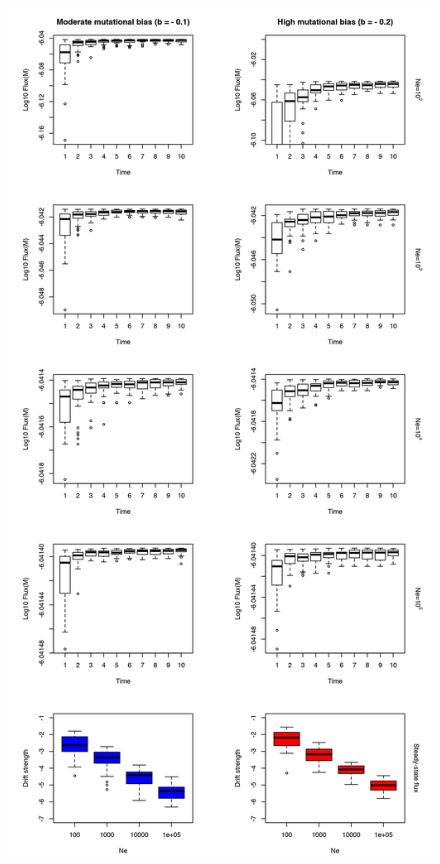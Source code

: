 \begin{figure}[H]
\vspace{-0.5cm}
\begin{center}
\includegraphics[scale=0.5,trim=0cm 0cm 0cm 0cm,clip]{pics/SM-Enzymes/Evo_SteadyState_PosMutCorr_LowF.jpeg} 

\end{center}
\end{figure}
